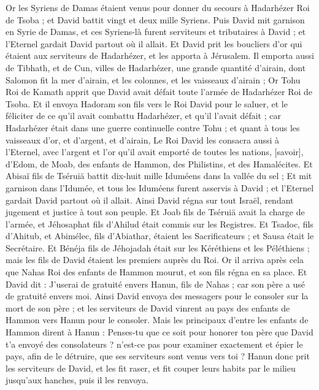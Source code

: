 \begin{multicols}{2}
Or les Syriens de Damas étaient venus pour donner du secours à Hadarhézer Roi de Tsoba ; et David battit vingt et deux mille Syriens.
Puis David mit garnison en Syrie de Damas, et ces Syriens-là furent serviteurs et tributaires à David ; et l'Eternel gardait David partout où il allait.
Et David prit les boucliers d'or qui étaient aux serviteurs de Hadarhézer, et les apporta à Jérusalem.
Il emporta aussi de Tibhath, et de Cun, villes de Hadarhézer, une grande quantité d'airain, dont Salomon fit la mer d'airain, et les colonnes, et les vaisseaux d'airain ;
Or Tohu Roi de Kamath apprit que David avait défait toute l'armée de Hadarhézer Roi de Tsoba.
Et il envoya Hadoram son fils vers le Roi David pour le saluer, et le féliciter de ce qu'il avait combattu Hadarhézer, et qu'il l'avait défait ; car Hadarhézer était dans une guerre continuelle contre Tohu ; et quant à tous les vaisseaux d'or, et d'argent, et d'airain,
Le Roi David les consacra aussi à l'Eternel, avec l'argent et l'or qu'il avait emporté de toutes les nations, [savoir], d'Edom, de Moab, des enfants de Hammon, des Philistins, et des Hamalécites.
Et Abisaï fils de Tséruiä battit dix-huit mille Iduméens dans la vallée du sel ;
Et mit garnison dans l'Idumée, et tous les Iduméens furent asservis à David ; et l'Eternel gardait David partout où il allait.
Ainsi David régna sur tout Israël, rendant jugement et justice à tout son peuple.
Et Joab fils de Tséruiä avait la charge de l'armée, et Jéhosaphat fils d'Ahilud était commis sur les Registres.
Et Tsadoc, fils d'Ahitub, et Abimélec, fils d'Abiathar, étaient les Sacrificateurs ; et Sausa était le Secrétaire.
Et Bénéja fils de Jéhojadah était sur les Kéréthiens et les Péléthiens ; mais les fils de David étaient les premiers auprès du Roi.
\VerseOne{}Or il arriva après cela que Nahas Roi des enfants de Hammon mourut, et son fils régna en sa place.
Et David dit : J'userai de gratuité envers Hanun, fils de Nahas ; car son père a usé de gratuité envers moi. Ainsi David envoya des messagers pour le consoler sur la mort de son père ; et les serviteurs de David vinrent au pays des enfants de Hammon vers Hanun pour le consoler.
Mais les principaux d'entre les enfants de Hammon dirent à Hanun : Penses-tu que ce soit pour honorer ton père que David t'a envoyé des consolateurs ? n'est-ce pas pour examiner exactement et épier le pays, afin de le détruire, que ses serviteurs sont venus vers toi ?
Hanun donc prit les serviteurs de David, et les fit raser, et fit couper leurs habits par le milieu jusqu'aux hanches, puis il les renvoya.

\end{multicols}
